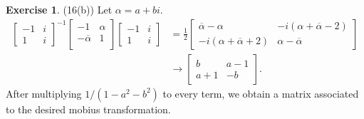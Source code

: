\documentclass[12pt, psamsfonts]{amsart}
\theoremstyle{definition}
\newtheorem*{exer}{Exercise}
\theoremstyle{remark}
\numberwithin{equation}{section}
\begin{document}
\begin{exer}{(16(b))}
  Let $\alpha = a + bi$.
  \begin{align*}
    \begin{bmatrix}
      -1 & i \\
      1 & i
    \end{bmatrix}^{-1}
    \begin{bmatrix}
      -1 & \alpha \\
      -\overline{\alpha} & 1 \\
    \end{bmatrix}
    \begin{bmatrix}
      -1 & i \\
      1 & i
    \end{bmatrix}
    &= \frac{1}{2} \begin{bmatrix} \overline{\alpha} - \alpha & -i(\alpha + \overline{\alpha} - 2) \\ -i(\alpha + \overline{\alpha} + 2) & \alpha - \overline{\alpha} \end{bmatrix} \\ 
    &\rightarrow \begin{bmatrix} b & a - 1 \\ a + 1 & -b \end{bmatrix}.
  \end{align*}
  After multiplying $1 / (1 - a^2 - b^2)$ to every term, we obtain a matrix associated to the desired mobius transformation.
\end{exer}
\end{document}
